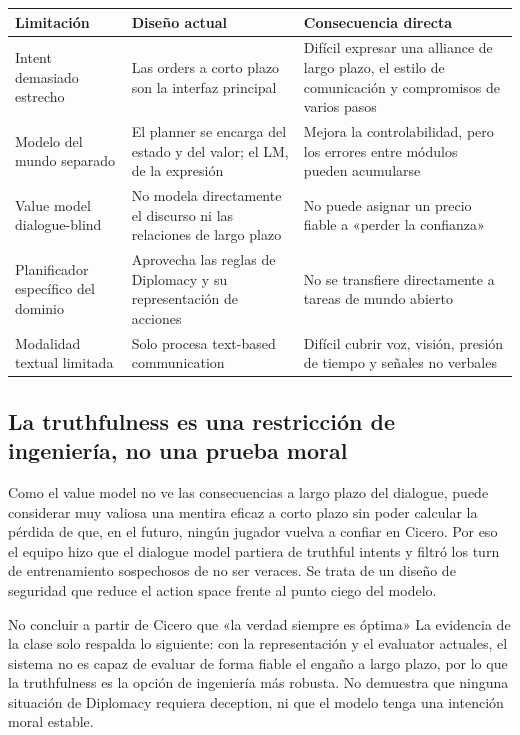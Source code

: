 \documentclass[a4paper]{article}
\begin{document}
\begin{longtable}{L{0.22\textwidth}L{0.31\textwidth}L{0.37\textwidth}}
\toprule
Limitación & Diseño actual & Consecuencia directa \\
\midrule
Intent demasiado estrecho & Las orders a corto plazo son la interfaz principal & Difícil expresar una alliance de largo plazo, el estilo de comunicación y compromisos de varios pasos \\
Modelo del mundo separado & El planner se encarga del estado y del valor; el LM, de la expresión & Mejora la controlabilidad, pero los errores entre módulos pueden acumularse \\
Value model dialogue-blind & No modela directamente el discurso ni las relaciones de largo plazo & No puede asignar un precio fiable a «perder la confianza» \\
Planificador específico del dominio & Aprovecha las reglas de Diplomacy y su representación de acciones & No se transfiere directamente a tareas de mundo abierto \\
Modalidad textual limitada & Solo procesa text-based communication & Difícil cubrir voz, visión, presión de tiempo y señales no verbales \\
\bottomrule
\end{longtable}

\subsection{La truthfulness es una restricción de ingeniería, no una prueba moral}

Como el value model no ve las consecuencias a largo plazo del dialogue, puede considerar muy valiosa una mentira eficaz a corto plazo sin poder calcular la pérdida de que, en el futuro, ningún jugador vuelva a confiar en Cicero. Por eso el equipo hizo que el dialogue model partiera de truthful intents y filtró los turn de entrenamiento sospechosos de no ser veraces. Se trata de un diseño de seguridad que reduce el action space frente al punto ciego del modelo.

\begin{warningbox}{No concluir a partir de Cicero que «la verdad siempre es óptima»}
La evidencia de la clase solo respalda lo siguiente: con la representación y el evaluator actuales, el sistema no es capaz de evaluar de forma fiable el engaño a largo plazo, por lo que la truthfulness es la opción de ingeniería más robusta. No demuestra que ninguna situación de Diplomacy requiera deception, ni que el modelo tenga una intención moral estable.
\end{warningbox}
\end{document}
